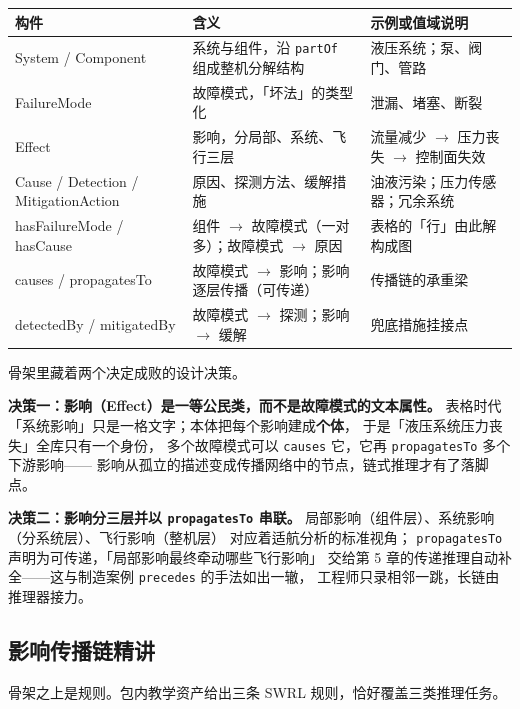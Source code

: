 \begin{center}
\begin{tabularx}{\linewidth}{@{}lXX@{}}
\toprule
\textbf{构件} & \textbf{含义} & \textbf{示例或值域说明} \\
\midrule
System / Component & 系统与组件，沿 \texttt{partOf} 组成整机分解结构 & 液压系统；泵、阀门、管路 \\
FailureMode & 故障模式，「坏法」的类型化 & 泄漏、堵塞、断裂 \\
Effect & 影响，分局部、系统、飞行三层 & 流量减少 \(\rightarrow\) 压力丧失 \(\rightarrow\) 控制面失效 \\
Cause / Detection / MitigationAction & 原因、探测方法、缓解措施 & 油液污染；压力传感器；冗余系统 \\
hasFailureMode / hasCause & 组件 \(\rightarrow\) 故障模式（一对多）；故障模式 \(\rightarrow\) 原因 & 表格的「行」由此解构成图 \\
causes / propagatesTo & 故障模式 \(\rightarrow\) 影响；影响逐层传播（可传递） & 传播链的承重梁 \\
detectedBy / mitigatedBy & 故障模式 \(\rightarrow\) 探测；影响 \(\rightarrow\) 缓解 & 兜底措施挂接点 \\
\bottomrule
\end{tabularx}
\end{center}

骨架里藏着两个决定成败的设计决策。

\textbf{决策一：影响（Effect）是一等公民类，而不是故障模式的文本属性。}
表格时代「系统影响」只是一格文字；本体把每个影响建成\textbf{个体}，
于是「液压系统压力丧失」全库只有一个身份，
多个故障模式可以 \texttt{causes} 它，它再 \texttt{propagatesTo} 多个下游影响——
影响从孤立的描述变成传播网络中的节点，链式推理才有了落脚点。

\textbf{决策二：影响分三层并以 \texttt{propagatesTo} 串联。}
局部影响（组件层）、系统影响（分系统层）、飞行影响（整机层）
对应着适航分析的标准视角；
\texttt{propagatesTo} 声明为可传递，「局部影响最终牵动哪些飞行影响」
交给第 5 章的传递推理自动补全——这与制造案例 \texttt{precedes} 的手法如出一辙，
工程师只录相邻一跳，长链由推理器接力。

\subsection{影响传播链精讲}

骨架之上是规则。包内教学资产给出三条 SWRL 规则，恰好覆盖三类推理任务。



